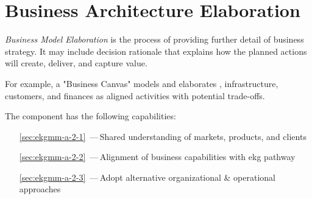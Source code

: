 \chapter{Business Architecture Elaboration}%
\label{ch:ekg-mm-a-2}
\label{ch:ekg-mm-business-architecture-elaboration}

\textit{Business Model Elaboration} is the process of providing further detail of business strategy.
It may include decision rationale that explains how the planned actions will create, deliver, and capture value.

For example, a "Business Canvas" models and elaborates ,
infrastructure, customers, and finances as aligned activities with potential trade-offs.

The  component has the following capabilities:

\begin{itemize}[leftmargin=.5in]
  \item [\ref{sec:ekgmm-a-2-1}] \,---\,Shared understanding of markets, products, and clients
  \item [\ref{sec:ekgmm-a-2-2}] \,---\,Alignment of business capabilities with \gls{ekg} pathway
  \item [\ref{sec:ekgmm-a-2-3}] \,---\,Adopt alternative organizational \& operational approaches
\end{itemize}






